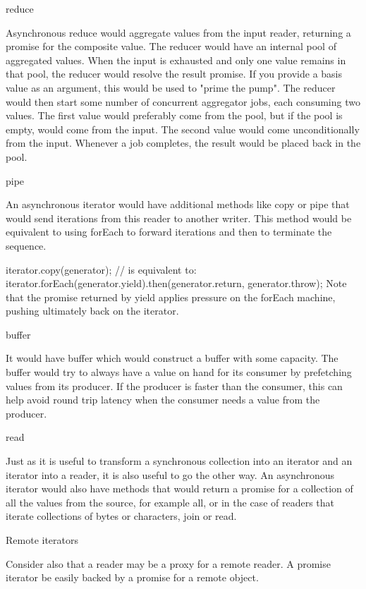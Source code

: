 reduce

Asynchronous reduce would aggregate values from the input reader, returning a promise for the composite value. The reducer would have an internal pool of aggregated values. When the input is exhausted and only one value remains in that pool, the reducer would resolve the result promise. If you provide a basis value as an argument, this would be used to "prime the pump". The reducer would then start some number of concurrent aggregator jobs, each consuming two values. The first value would preferably come from the pool, but if the pool is empty, would come from the input. The second value would come unconditionally from the input. Whenever a job completes, the result would be placed back in the pool.

pipe

An asynchronous iterator would have additional methods like copy or pipe that would send iterations from this reader to another writer. This method would be equivalent to using forEach to forward iterations and then to terminate the sequence.

iterator.copy(generator);
// is equivalent to:
iterator.forEach(generator.yield).then(generator.return, generator.throw);
Note that the promise returned by yield applies pressure on the forEach machine, pushing ultimately back on the iterator.

buffer

It would have buffer which would construct a buffer with some capacity. The buffer would try to always have a value on hand for its consumer by prefetching values from its producer. If the producer is faster than the consumer, this can help avoid round trip latency when the consumer needs a value from the producer.

read

Just as it is useful to transform a synchronous collection into an iterator and an iterator into a reader, it is also useful to go the other way. An asynchronous iterator would also have methods that would return a promise for a collection of all the values from the source, for example all, or in the case of readers that iterate collections of bytes or characters, join or read.

Remote iterators

Consider also that a reader may be a proxy for a remote reader. A promise iterator be easily backed by a promise for a remote object.

